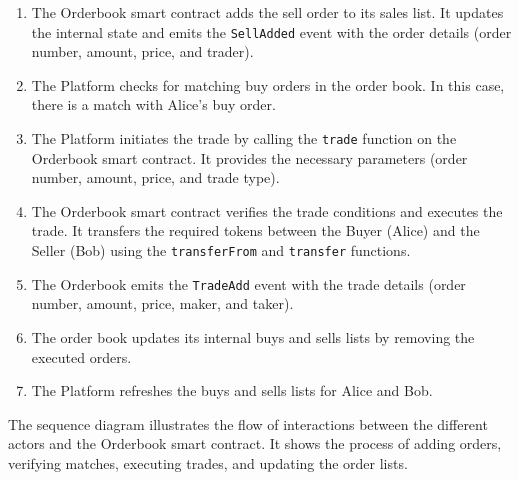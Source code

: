 \begin{enumerate}
    \item The Orderbook smart contract adds the sell order to its sales list. It updates the internal state and emits the \texttt{SellAdded} event with the order details (order number, amount, price, and trader).
    \item The Platform checks for matching buy orders in the order book. In this case, there is a match with Alice's buy order.
    \item The Platform initiates the trade by calling the \texttt{trade} function on the Orderbook smart contract. It provides the necessary parameters (order number, amount, price, and trade type).
    \item The Orderbook smart contract verifies the trade conditions and executes the trade. It transfers the required tokens between the Buyer (Alice) and the Seller (Bob) using the \texttt{transferFrom} and \texttt{transfer} functions.
    \item The Orderbook emits the \texttt{TradeAdd} event with the trade details (order number, amount, price, maker, and taker).
    \item The order book updates its internal buys and sells lists by removing the executed orders.
    \item The Platform refreshes the buys and sells lists for Alice and Bob.
\end{enumerate}

The sequence diagram illustrates the flow of interactions between the different actors and the Orderbook smart contract. It shows the process of adding orders, verifying matches, executing trades, and updating the order lists.


